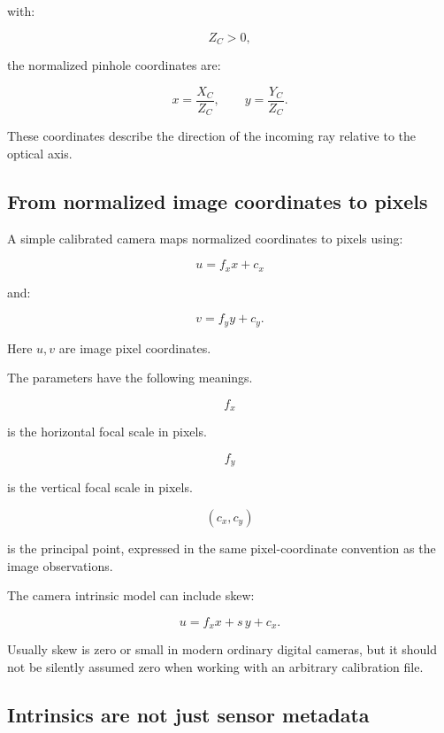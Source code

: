 with:

\[
 Z_C>0,
\]

the normalized pinhole coordinates are:

\[
 \boxed{ x=\frac{X_C}{Z_C}, \qquad y=\frac{Y_C}{Z_C} }.
\]

These coordinates describe the direction of the incoming ray relative to the optical axis.

\subsection{From normalized image coordinates to pixels}\label{02-foundations-ii-ch034-from-normalized-image-coordinates-to-pixels}

\hypertarget{02-foundations-ii-ch034-from-normalized-image-coordinates-to-pixels}{}

A simple calibrated camera maps normalized coordinates to pixels using:

\[
 \boxed{ u=f_xx+c_x }
\]

and:

\[
 \boxed{ v=f_yy+c_y }.
\]

Here \(u,v\) are image pixel coordinates.

The parameters have the following meanings.

\[
 f_x
\]

is the horizontal focal scale in pixels.

\[
 f_y
\]

is the vertical focal scale in pixels.

\[
 (c_x,c_y)
\]

is the principal point, expressed in the same pixel-coordinate convention as the image observations.

The camera intrinsic model can include skew:

\[
 \boxed{ u=f_xx+s\,y+c_x }.
\]

Usually skew is zero or small in modern ordinary digital cameras, but it should not be silently assumed zero when working with an arbitrary calibration file.

\subsection{Intrinsics are not just sensor metadata}\label{02-foundations-ii-ch034-intrinsics-are-not-just-sensor-metadata}

\hypertarget{02-foundations-ii-ch034-intrinsics-are-not-just-sensor-metadata}{}

